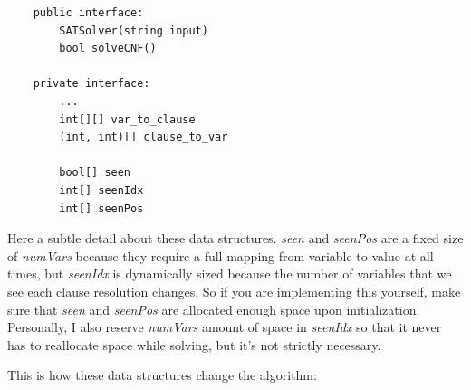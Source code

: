 \begin{lstlisting}
    public interface:
        SATSolver(string input)
        bool solveCNF()

    private interface:
        ...
        int[][] var_to_clause
        (int, int)[] clause_to_var

        bool[] seen
        int[] seenIdx
        int[] seenPos
\end{lstlisting}

\noindent
Here a subtle detail about these data structures. \textit{seen} and \textit{seenPos}
are a fixed size of \textit{numVars} because they require a full mapping from variable
to value at all times, but \textit{seenIdx} is dynamically sized because the number of 
variables that we see each clause resolution changes. So if you are implementing this 
yourself, make sure that \textit{seen} and \textit{seenPos} are allocated enough space 
upon initialization. Personally, I also reserve \textit{numVars} amount of space in 
\textit{seenIdx} so that it never has to reallocate space while solving, but it's not 
strictly necessary. 

This is how these data structures change the algorithm:

